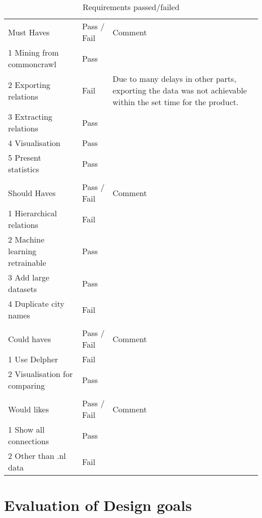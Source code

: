 \begin{table}[h]
\centering
\caption{Requirements passed/failed}
\label{requirements_pass/fail}
\begin{tabular}{lll}
Must Haves                     & Pass / Fail & Comment \\
1 Mining from commoncrawl      & Pass        &         \\
2 Exporting relations          & Fail        & Due to many delays in other parts, exporting the data was not achievable within the set time for the product. \\
3 Extracting relations         & Pass        &         \\
4 Visualisation                & Pass        &         \\
5 Present statistics           & Pass        &         \\
                               &             &         \\
Should Haves                   & Pass / Fail & Comment \\
1 Hierarchical relations       & Fail        &         \\
2 Machine learning retrainable & Pass        &         \\
3 Add large datasets           & Pass        &         \\
4 Duplicate city names         & Fail        &         \\
                               &             &         \\
Could haves                    & Pass / Fail & Comment \\
1 Use Delpher                  & Fail        &         \\
2 Visualisation for comparing  & Pass        &         \\
                               &             &         \\
Would likes                    & Pass / Fail & Comment \\
1 Show all connections         & Pass        &         \\
2 Other than .nl data          & Fail        &        
\end{tabular}
\end{table}

\section{Evaluation of Design goals}

